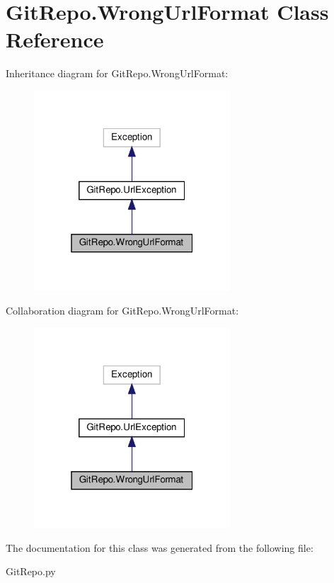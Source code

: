 \hypertarget{class_git_repo_1_1_wrong_url_format}{}\section{Git\+Repo.\+Wrong\+Url\+Format Class Reference}
\label{class_git_repo_1_1_wrong_url_format}


Inheritance diagram for Git\+Repo.\+Wrong\+Url\+Format\+:\nopagebreak
\begin{figure}[H]
\begin{center}
\leavevmode
\includegraphics[width=208pt]{class_git_repo_1_1_wrong_url_format__inherit__graph}
\end{center}
\end{figure}


Collaboration diagram for Git\+Repo.\+Wrong\+Url\+Format\+:\nopagebreak
\begin{figure}[H]
\begin{center}
\leavevmode
\includegraphics[width=208pt]{class_git_repo_1_1_wrong_url_format__coll__graph}
\end{center}
\end{figure}


The documentation for this class was generated from the following file\+:\begin{DoxyCompactItemize}
\item 
Git\+Repo.\+py\end{DoxyCompactItemize}
